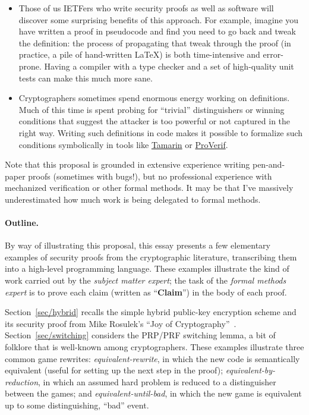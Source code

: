 \documentclass{article}
\begin{document}
\begin{itemize}
  \item Those of us IETFers who write security proofs as well as software will
    discover some surprising benefits of this approach.
    For example, imagine you have written a proof in pseudocode and find you
    need to go back and tweak the definition: the process of propagating that
    tweak through the proof (in practice, a pile of hand-written \LaTeX) is
    both time-intensive and error-prone. Having a compiler with a type checker
    and a set of high-quality unit tests can make this much more sane.

  \item Cryptographers sometimes spend enormous energy working on definitions.
    Much of this time is spent probing for ``trivial'' distinguishers or
    winning conditions that suggest the attacker is too powerful or not
    captured in the right way.
    Writing such definitions in code makes it possible to formalize such
    conditions symbolically in tools like
    \href{https://tamarin-prover.com/}{Tamarin} or
    \href{https://bblanche.gitlabpages.inria.fr/proverif/}{ProVerif}.
\end{itemize}

Note that this proposal is grounded in extensive experience writing
pen-and-paper proofs (sometimes with bugs!), but no professional experience
with mechanized verification or other formal methods.
%
It may be that I've massively underestimated how much work is being delegated
to formal methods.

\paragraph{Outline.}
%
By way of illustrating this proposal, this essay presents a few elementary
examples of security proofs from the cryptographic literature, transcribing
them into a high-level programming language.
%
These examples illustrate the kind of work carried out by the \emph{subject
matter expert}; the task of the \emph{formal methods expert} is to prove each
claim (written as ``\textbf{Claim}'') in the body of each proof.

Section~\ref{sec/hybrid} recalls the simple hybrid public-key encryption scheme
and its security proof from Mike Rosulek's ``Joy of Cryptography''~\cite{joy}.
%
Section~\ref{sec/switching} considers the PRP/PRF switching lemma, a bit of
folklore that is well-known among cryptographers.
%
These examples illustrate three common game rewrites:
%
\emph{equivalent-rewrite}, in which the new code is semantically equivalent
(useful for setting up the next step in the proof);
%
\emph{equivalent-by-reduction}, in which an assumed hard problem is reduced to
a distinguisher between the games; and
%
\emph{equivalent-until-bad}, in which the new game is equivalent up to some
distinguishing, ``bad'' event.
\end{document}
